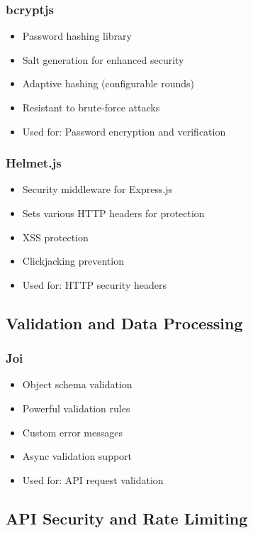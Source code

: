 \subsubsection{bcryptjs}
\begin{itemize}[leftmargin=*]
    \item Password hashing library
    \item Salt generation for enhanced security
    \item Adaptive hashing (configurable rounds)
    \item Resistant to brute-force attacks
    \item Used for: Password encryption and verification
\end{itemize}

\subsubsection{Helmet.js}
\begin{itemize}[leftmargin=*]
    \item Security middleware for Express.js
    \item Sets various HTTP headers for protection
    \item XSS protection
    \item Clickjacking prevention
    \item Used for: HTTP security headers
\end{itemize}

\subsection{Validation and Data Processing}

\subsubsection{Joi}
\begin{itemize}[leftmargin=*]
    \item Object schema validation
    \item Powerful validation rules
    \item Custom error messages
    \item Async validation support
    \item Used for: API request validation
\end{itemize}

\subsection{API Security and Rate Limiting}

